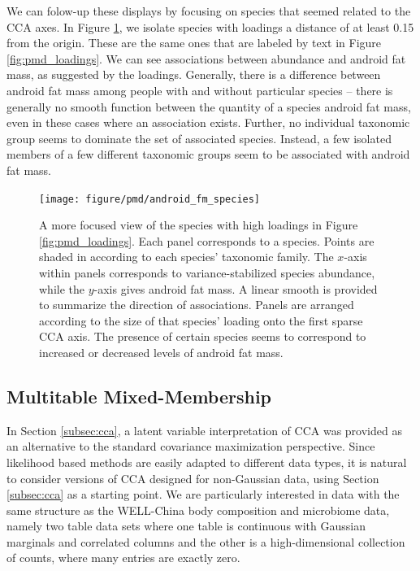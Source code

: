\documentclass[14pt]{extarticle}
\begin{document}
We can folow-up these displays by focusing on species that seemed related to the
CCA axes. In Figure \ref{fig:pmd_android_fm_species}, we isolate species with
loadings a distance of at least 0.15 from the origin. These are the same ones
that are labeled by text in Figure \ref{fig:pmd_loadings}. We can see
associations between abundance and android fat mass, as suggested by the
loadings. Generally, there is a difference between android fat mass among people
with and without particular species -- there is generally no smooth function
between the quantity of a species android fat mass, even in these cases where an
association exists. Further, no individual taxonomic group seems to dominate the
set of associated species. Instead, a few isolated members of a few different
taxonomic groups seem to be associated with android fat mass.

\begin{figure}
  \centering
  \texttt{[image: figure/pmd/android\_fm\_species]}
  \caption{
    A more focused view of the species with high loadings in Figure
    \ref{fig:pmd_loadings}. Each panel corresponds to a species. Points are
    shaded in according to each species' taxonomic family. The $x$-axis within
    panels corresponds to variance-stabilized species abundance, while the
    $y$-axis gives android fat mass. A linear smooth is provided to summarize
    the direction of associations. Panels are arranged according to the size of
    that species' loading onto the first sparse CCA axis. The presence of
    certain species seems to correspond to increased or decreased levels of
    android fat mass.
    \label{fig:pmd_android_fm_species}
  }
\end{figure}

\subsection{Multitable Mixed-Membership}
\label{subsec:multitable_mixed_membership}

In Section \ref{subsec:cca}, a latent variable interpretation of CCA was
provided as an alternative to the standard covariance maximization perspective.
Since likelihood based methods are easily adapted to different data types, it is
natural to consider versions of CCA designed for non-Gaussian data, using
Section \ref{subsec:cca} as a starting point. We are particularly interested in
data with the same structure as the WELL-China body composition and microbiome
data, namely two table data sets where one table is continuous with Gaussian
marginals and correlated columns and the other is a high-dimensional collection
of counts, where many entries are exactly zero.
\end{document}
